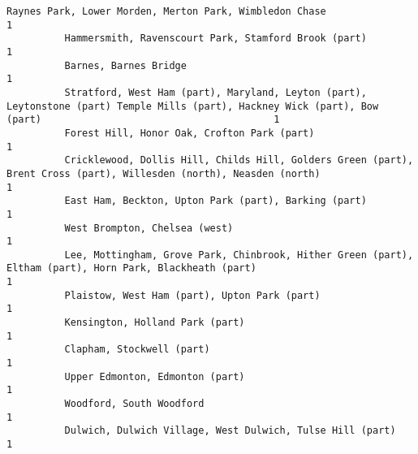 \documentclass[11pt]{article}
\begin{document}
\begin{Verbatim}[commandchars=\\\{\}]
          Raynes Park, Lower Morden, Merton Park, Wimbledon Chase                                                                                                             1
          Hammersmith, Ravenscourt Park, Stamford Brook (part)                                                                                                                1
          Barnes, Barnes Bridge                                                                                                                                               1
          Stratford, West Ham (part), Maryland, Leyton (part), Leytonstone (part) Temple Mills (part), Hackney Wick (part), Bow (part)                                        1
          Forest Hill, Honor Oak, Crofton Park (part)                                                                                                                         1
          Cricklewood, Dollis Hill, Childs Hill, Golders Green (part), Brent Cross (part), Willesden (north), Neasden (north)                                                 1
          East Ham, Beckton, Upton Park (part), Barking (part)                                                                                                                1
          West Brompton, Chelsea (west)                                                                                                                                       1
          Lee, Mottingham, Grove Park, Chinbrook, Hither Green (part), Eltham (part), Horn Park, Blackheath (part)                                                            1
          Plaistow, West Ham (part), Upton Park (part)                                                                                                                        1
          Kensington, Holland Park (part)                                                                                                                                     1
          Clapham, Stockwell (part)                                                                                                                                           1
          Upper Edmonton, Edmonton (part)                                                                                                                                     1
          Woodford, South Woodford                                                                                                                                            1
          Dulwich, Dulwich Village, West Dulwich, Tulse Hill (part)                                                                                                           1

\end{Verbatim}
\end{document}
